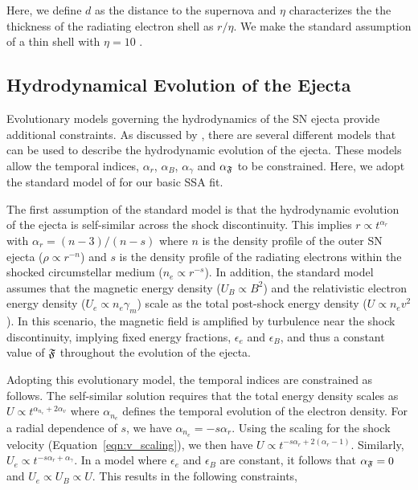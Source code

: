 \documentclass[12pt,preprint]{aastex}
\begin{document}
\noindent
Here, we define $d$ as the distance to the supernova and $\eta$
characterizes the the thickness of the radiating electron shell as
$r/\eta$.  We make the standard assumption of a thin shell with $\eta
=10$ \citep{lc99,fwk00}.

\subsection{Hydrodynamical Evolution of the Ejecta}
\label{sec:hydro}
Evolutionary models governing the hydrodynamics of the SN ejecta
provide additional constraints.  As discussed by \citet{c96}, there
are several different models that can be used to describe the
hydrodynamic evolution of the ejecta.  These models allow the temporal
indices, $\alpha_r$, $\alpha_B$, $\alpha_{\gamma}$ and
$\alpha_{\frak{F}}$ to be constrained.  Here, we adopt the standard
model of \citealt{c96} for our basic SSA fit.

The first assumption of the standard model is that the hydrodynamic
evolution of the ejecta is self-similar across the shock
discontinuity.  This implies $r\propto t^{\alpha_r}$ with
$\alpha_r=(n-3)/(n-s)$ where $n$ is the density profile of the outer
SN ejecta ($\rho \propto r^{-n}$) and $s$ is the density profile of
the radiating electrons within the shocked circumstellar medium ($n_e
\propto r^{-s}$).  In addition, the standard model assumes that the
magnetic energy density ($U_B \propto B^2$) and the relativistic
electron energy density ($U_e \propto n_e \gamma_m$) scale as the
total post-shock energy density ($U \propto n_e v^2$).  In this
scenario, the magnetic field is amplified by turbulence near the shock
discontinuity, implying fixed energy fractions, $\epsilon_e$ and
$\epsilon_B$, and thus a constant value of $\frak{F}$ throughout the
evolution of the ejecta. 

Adopting this evolutionary model, the temporal indices are constrained
as follows.  The self-similar solution requires that the total energy
density scales as $U \propto t^{\alpha_{n_e} + 2\alpha_v}$ where
$\alpha_{n_e}$ defines the temporal evolution of the electron density.
For a radial dependence of $s$, we have
$\alpha_{n_e}=-s\alpha_r$. Using the scaling for the shock velocity
(Equation~\ref{eqn:v_scaling}), we then have $U \propto t^{-s
\alpha_r+2(\alpha_r-1)}$.  Similarly, $U_e \propto t^{-s
\alpha_r+\alpha_{\gamma}}$.  In a model where $\epsilon_e$ and
$\epsilon_B$ are constant, it follows that $\alpha_{\frak{F}}=0$ and
$U_e \propto U_B \propto U$.  This results in the following constraints,
\end{document}
